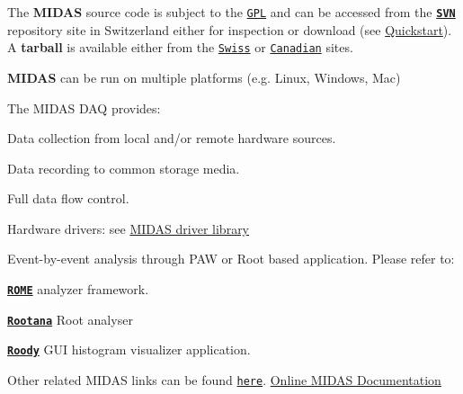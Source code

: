 \begin{DoxyItemize}
\item The {\bfseries MIDAS} source code is subject to the \href{http://www.gnu.org/copyleft/gpl.html}{\tt GPL} and can be accessed from the {\bfseries \href{http://savannah.psi.ch/viewcvs/trunk/?root=midas}{\tt SVN}} repository site in Switzerland either for inspection or download (see \hyperlink{Quickstart}{Quickstart}). A {\bfseries  tarball } is available either from the \href{http://midas.psi.ch/download/}{\tt Swiss} or \href{http://ladd00.triumf.ca/~daqweb/ftp/}{\tt Canadian} sites.
\end{DoxyItemize}


\begin{DoxyItemize}
\item {\bfseries MIDAS} can be run on multiple platforms (e.g. Linux, Windows, Mac)
\end{DoxyItemize}

 The MIDAS DAQ provides: 
\begin{DoxyItemize}
\item Data collection from local and/or remote hardware sources.
\item Data recording to common storage media.
\item Full data flow control.
\item Hardware drivers: see \hyperlink{FE_Hardware}{MIDAS driver library}
\item Event-\/by-\/event analysis through PAW or Root based application. Please refer to: 
\begin{DoxyItemize}
\item {\bfseries \href{http://midas.psi.ch/rome}{\tt ROME}} analyzer framework. 
\item {\bfseries \href{http://ladd00.triumf.ca/%7Eolchansk/rootana/}{\tt Rootana}} Root analyser 
\item {\bfseries \href{http://ladd00.triumf.ca/~daqweb/doc/roody/html/}{\tt Roody}} GUI histogram visualizer application. 
\end{DoxyItemize}
\end{DoxyItemize}

Other related MIDAS links can be found \href{http://daq-plone.triumf.ca/SR/MIDAS/}{\tt here}. \label{_online midas doc}
  \hyperlink{Organization}{Online MIDAS Documentation} 

